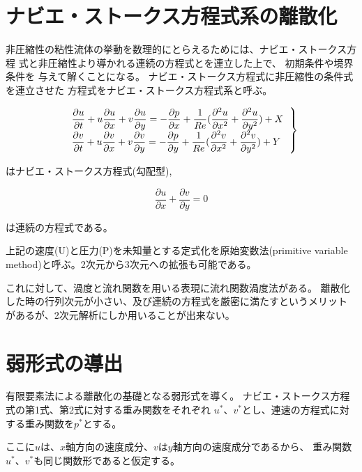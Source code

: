 \documentclass{jarticle}
\begin{document}
\section{ナビエ・ストークス方程式系の離散化}
非圧縮性の粘性流体の挙動を数理的にとらえるためには、ナビエ・ストークス方程
式と非圧縮性より導かれる連続の方程式とを連立した上で、 初期条件や境界条件を
与えて解くことになる。 ナビエ・ストークス方程式に非圧縮性の条件式を連立させた
方程式をナビエ・ストークス方程式系と呼ぶ。


\begin{equation}
\left.
\begin{tabular}{l}
$\displaystyle
\frac{\partial u}{\partial t}+u\frac{\partial u}{\partial x}+v\frac{\partial u}{\partial y} = -\frac{\partial p}{\partial x}+\frac{1}{Re}(\frac{\partial^2 u}{\partial x^2}+\frac{\partial^2 u}{\partial y^2})+X$\\
$\displaystyle  
\frac{\partial v}{\partial t}+u\frac{\partial v}{\partial x}+v\frac{\partial v}{\partial y} = -\frac{\partial p}{\partial y}+\frac{1}{Re}(\frac{\partial^2 v}{\partial x^2}+\frac{\partial^2 v}{\partial y^2})+Y$
\end{tabular}
\right\}
\end{equation}

\theequation はナビエ・ストークス方程式(勾配型),

\begin{equation}
\displaystyle
  \frac{\partial u}{\partial x}+\frac{\partial v}{\partial y} = 0
\end{equation}

\theequation は連続の方程式である。

上記の速度(U)と圧力(P)を未知量とする定式化を原始変数法(primitive variable method)と呼ぶ。2次元から3次元への拡張も可能である。

これに対して、渦度と流れ関数を用いる表現に流れ関数渦度法がある。
離散化した時の行列次元が小さい、及び連続の方程式を厳密に満たすというメリット
があるが、2次元解析にしか用いることが出来ない。


\section{弱形式の導出}

有限要素法による離散化の基礎となる弱形式を導く。
ナビエ・ストークス方程式の第1式、第2式に対する重み関数をそれぞれ
$u^*$、$v^*$とし、連速の方程式に対する重み関数を$p^*$とする。

ここに$u$は、$x$軸方向の速度成分、$v$は$y$軸方向の速度成分であるから、
重み関数$u^*$、$v^*$も同じ関数形であると仮定する。
\end{document}

